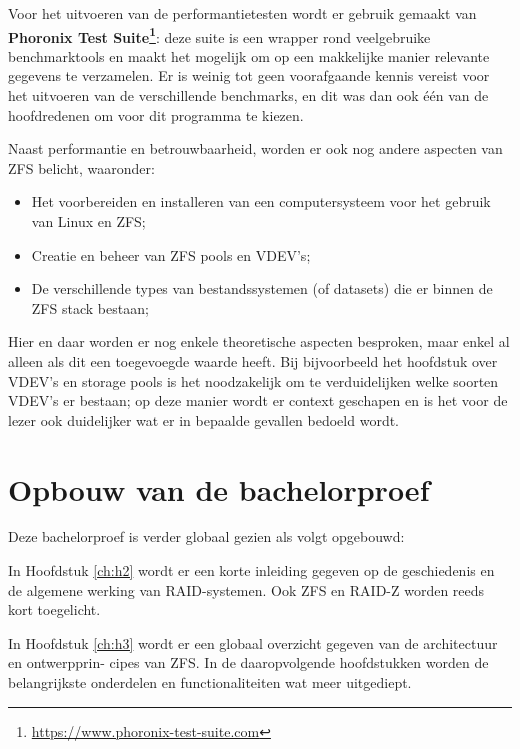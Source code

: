 Voor het uitvoeren van de performantietesten wordt er gebruik gemaakt van \textbf{Phoronix Test Suite\footnote{\url{https://www.phoronix-test-suite.com}}}: deze suite is een wrapper rond veelgebruike benchmarktools en maakt het mogelijk om op een makkelijke manier relevante gegevens te verzamelen. Er is weinig tot geen voorafgaande kennis vereist voor het uitvoeren van de verschillende benchmarks, en dit was dan ook één van de hoofdredenen om voor dit programma te kiezen. 

Naast performantie en betrouwbaarheid, worden er ook nog andere aspecten van ZFS belicht, waaronder:

\begin{itemize}
  \item{Het voorbereiden en installeren van een computersysteem voor het gebruik van Linux en ZFS;}
  \item{Creatie en beheer van ZFS pools en VDEV's;}
  \item{De verschillende types van bestandssystemen (of datasets) die er binnen de ZFS stack bestaan;}
\end{itemize}

Hier en daar worden er nog enkele theoretische aspecten besproken, maar enkel al alleen als dit een toegevoegde waarde heeft. Bij bijvoorbeeld het hoofdstuk over VDEV's en storage pools is het noodzakelijk om te verduidelijken welke soorten VDEV's er bestaan; op deze manier wordt er context geschapen en is het voor de lezer ook duidelijker wat er in bepaalde gevallen bedoeld wordt.

\section{Opbouw van de bachelorproef}

Deze bachelorproef is verder globaal gezien als volgt opgebouwd:


In Hoofdstuk \ref{ch:h2} wordt er een korte inleiding gegeven op de geschiedenis en de algemene
werking van RAID-systemen. Ook ZFS en RAID-Z worden reeds kort toegelicht.

In Hoofdstuk \ref{ch:h3} wordt er een globaal overzicht gegeven van de architectuur en ontwerpprin-
cipes van ZFS. In de daaropvolgende hoofdstukken worden de belangrijkste onderdelen en
functionaliteiten wat meer uitgediept.

